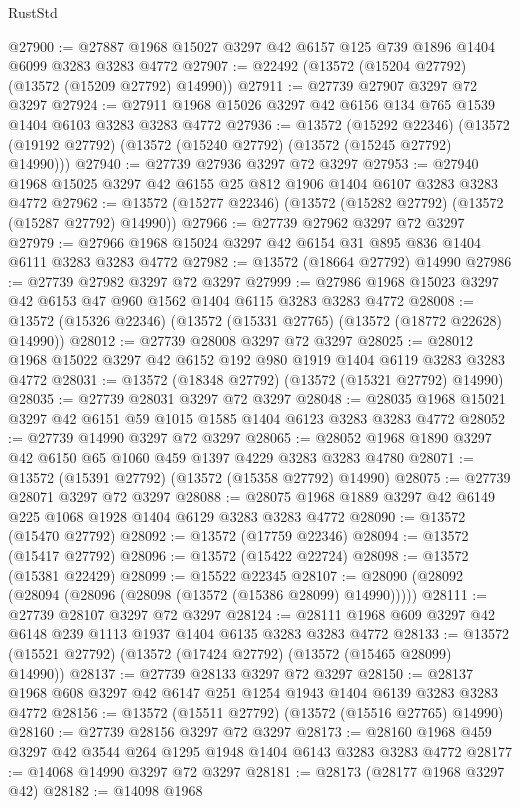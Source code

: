 \begin{lexlean}{RustStd}
\begin{coremodule}
@27900 := @27887 @1968 @15027 @3297 @42 @6157 @125 @739 @1896 @1404 @6099 @3283 @3283 @4772
@27907 := @22492 (@13572 (@15204 @27792) (@13572 (@15209 @27792) @14990))
@27911 := @27739 @27907 @3297 @72 @3297
@27924 := @27911 @1968 @15026 @3297 @42 @6156 @134 @765 @1539 @1404 @6103 @3283 @3283 @4772
@27936 := @13572
    (@15292 @22346)
    (@13572 (@19192 @27792) (@13572 (@15240 @27792) (@13572 (@15245 @27792) @14990)))
@27940 := @27739 @27936 @3297 @72 @3297
@27953 := @27940 @1968 @15025 @3297 @42 @6155 @25 @812 @1906 @1404 @6107 @3283 @3283 @4772
@27962 := @13572 (@15277 @22346) (@13572 (@15282 @27792) (@13572 (@15287 @27792) @14990))
@27966 := @27739 @27962 @3297 @72 @3297
@27979 := @27966 @1968 @15024 @3297 @42 @6154 @31 @895 @836 @1404 @6111 @3283 @3283 @4772
@27982 := @13572 (@18664 @27792) @14990
@27986 := @27739 @27982 @3297 @72 @3297
@27999 := @27986 @1968 @15023 @3297 @42 @6153 @47 @960 @1562 @1404 @6115 @3283 @3283 @4772
@28008 := @13572 (@15326 @22346) (@13572 (@15331 @27765) (@13572 (@18772 @22628) @14990))
@28012 := @27739 @28008 @3297 @72 @3297
@28025 := @28012 @1968 @15022 @3297 @42 @6152 @192 @980 @1919 @1404 @6119 @3283 @3283 @4772
@28031 := @13572 (@18348 @27792) (@13572 (@15321 @27792) @14990)
@28035 := @27739 @28031 @3297 @72 @3297
@28048 := @28035 @1968 @15021 @3297 @42 @6151 @59 @1015 @1585 @1404 @6123 @3283 @3283 @4772
@28052 := @27739 @14990 @3297 @72 @3297
@28065 := @28052 @1968 @1890 @3297 @42 @6150 @65 @1060 @459 @1397 @4229 @3283 @3283 @4780
@28071 := @13572 (@15391 @27792) (@13572 (@15358 @27792) @14990)
@28075 := @27739 @28071 @3297 @72 @3297
@28088 := @28075 @1968 @1889 @3297 @42 @6149 @225 @1068 @1928 @1404 @6129 @3283 @3283 @4772
@28090 := @13572 (@15470 @27792)
@28092 := @13572 (@17759 @22346)
@28094 := @13572 (@15417 @27792)
@28096 := @13572 (@15422 @22724)
@28098 := @13572 (@15381 @22429)
@28099 := @15522 @22345
@28107 := @28090 (@28092 (@28094 (@28096 (@28098 (@13572 (@15386 @28099) @14990)))))
@28111 := @27739 @28107 @3297 @72 @3297
@28124 := @28111 @1968 @609 @3297 @42 @6148 @239 @1113 @1937 @1404 @6135 @3283 @3283 @4772
@28133 := @13572 (@15521 @27792) (@13572 (@17424 @27792) (@13572 (@15465 @28099) @14990))
@28137 := @27739 @28133 @3297 @72 @3297
@28150 := @28137 @1968 @608 @3297 @42 @6147 @251 @1254 @1943 @1404 @6139 @3283 @3283 @4772
@28156 := @13572 (@15511 @27792) (@13572 (@15516 @27765) @14990)
@28160 := @27739 @28156 @3297 @72 @3297
@28173 := @28160 @1968 @459 @3297 @42 @3544 @264 @1295 @1948 @1404 @6143 @3283 @3283 @4772
@28177 := @14068 @14990 @3297 @72 @3297
@28181 := @28173 (@28177 @1968 @3297 @42)
@28182 := @14098 @1968

\end{coremodule}
\end{lexlean}
